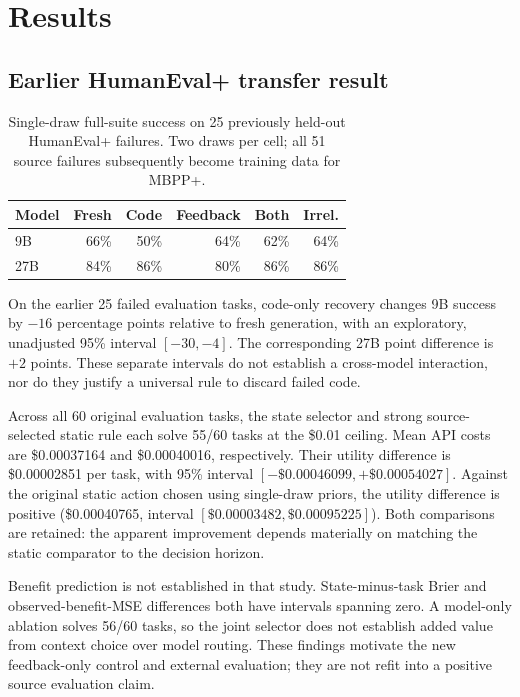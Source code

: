 \documentclass[10pt,twocolumn]{article}
\begin{document}
\section{Results}

\subsection{Earlier HumanEval+ transfer result}

\begin{table}[t]
\centering
\caption{Single-draw full-suite success on 25 previously held-out HumanEval+
failures. Two draws per cell; all 51 source failures subsequently become training
data for MBPP+.}
\label{tab:source}
\small
\begin{tabular}{lrrrrr}
\toprule
Model & Fresh & Code & Feedback & Both & Irrel.\\
\midrule
9B & 66\% & 50\% & 64\% & 62\% & 64\%\\
27B & 84\% & 86\% & 80\% & 86\% & 86\%\\
\bottomrule
\end{tabular}
\end{table}

On the earlier 25 failed evaluation tasks, code-only recovery changes 9B success
by $-16$ percentage points relative to fresh generation, with an exploratory,
unadjusted 95\% interval $[-30,-4]$. The corresponding 27B point difference is
$+2$ points. These separate intervals do not establish a cross-model interaction,
nor do they justify a universal rule to discard failed code.

Across all 60 original evaluation tasks, the state selector and strong
source-selected static rule each solve 55/60 tasks at the \$0.01 ceiling.
Mean API costs are \$0.00037164 and \$0.00040016, respectively. Their utility
difference is \$0.00002851 per task, with 95\% interval
$[-\$0.00046099,+\$0.00054027]$. Against the original static action chosen using
single-draw priors, the utility difference is positive
(\$0.00040765, interval $[\$0.00003482,\$0.00095225]$).
Both comparisons are retained: the apparent improvement depends materially on
matching the static comparator to the decision horizon.

Benefit prediction is not established in that study. State-minus-task Brier
and observed-benefit-MSE differences both have intervals spanning zero. A
model-only ablation solves 56/60 tasks, so the joint selector does not establish
added value from context choice over model routing. These findings motivate the
new feedback-only control and external evaluation; they are not refit into a
positive source evaluation claim.
\end{document}
